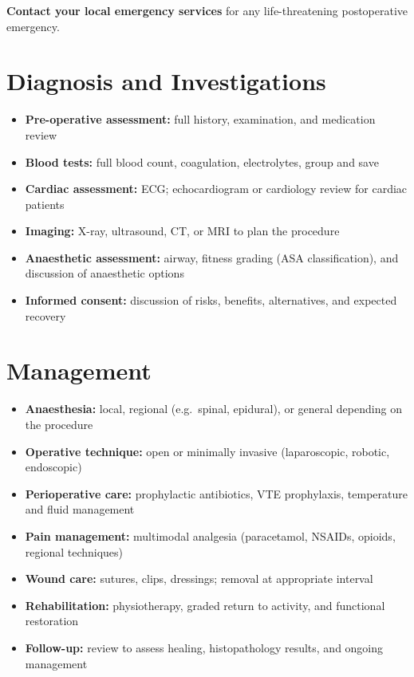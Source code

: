 \textbf{Contact your local emergency services} for any life-threatening postoperative emergency.

\section*{Diagnosis and Investigations}
\begin{itemize}
    \item \textbf{Pre-operative assessment:} full history, examination, and medication review
    \item \textbf{Blood tests:} full blood count, coagulation, electrolytes, group and save
    \item \textbf{Cardiac assessment:} ECG; echocardiogram or cardiology review for cardiac patients
    \item \textbf{Imaging:} X-ray, ultrasound, CT, or MRI to plan the procedure
    \item \textbf{Anaesthetic assessment:} airway, fitness grading (ASA classification), and discussion of anaesthetic options
    \item \textbf{Informed consent:} discussion of risks, benefits, alternatives, and expected recovery
\end{itemize}

\section*{Management}
\begin{itemize}
    \item \textbf{Anaesthesia:} local, regional (e.g.\ spinal, epidural), or general depending on the procedure
    \item \textbf{Operative technique:} open or minimally invasive (laparoscopic, robotic, endoscopic)
    \item \textbf{Perioperative care:} prophylactic antibiotics, VTE prophylaxis, temperature and fluid management
    \item \textbf{Pain management:} multimodal analgesia (paracetamol, NSAIDs, opioids, regional techniques)
    \item \textbf{Wound care:} sutures, clips, dressings; removal at appropriate interval
    \item \textbf{Rehabilitation:} physiotherapy, graded return to activity, and functional restoration
    \item \textbf{Follow-up:} review to assess healing, histopathology results, and ongoing management
\end{itemize}

